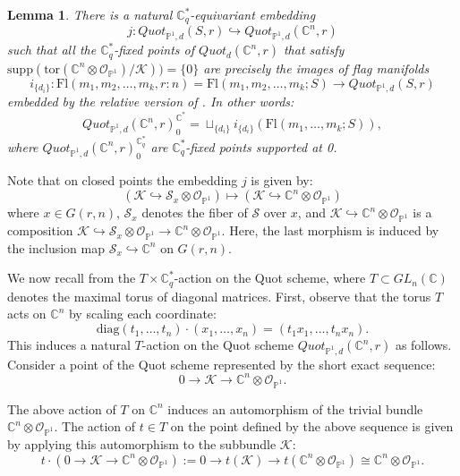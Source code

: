 \documentclass{amsart}
\newtheorem{lemma}[thm]{Lemma}
\begin{document}
\begin{lemma}\label{Relative fixed-points}
    There is a natural $\mathbb{C}_q^*$-equivariant embedding
    \[
    j:Quot_{\mathbb{P}^1,d}(S,r) \hookrightarrow Quot_{\mathbb{P}^1,d}(\mathbb{C}^n,r) 
    \]
    such that all the $\mathbb{C}_q^*$-fixed points of $Quot_d(\mathbb{C}^n,r)$ that satisfy $\mathrm{supp}(\mathrm{tor}(\mathbb{C}^n \otimes \mathcal{O}_{\mathbb{P}^1})/\mathcal{K}))=\{0\}$ are precisely the images of flag manifolds
    \[
    i_{\{d_i\}}: \mathrm{Fl}(m_1 , m_2, \dots , m_k,r:n)=\mathrm{Fl}(m_1 , m_2 , \dots , m_k;S) \to Quot_{\mathbb{P}^1,d}(S,r)
    \]
    embedded by the relative version of . In other words:
    \[
    Quot_{\mathbb{P}^1,d}(\mathbb{C}^n,r)^{\mathbb{C}^*}_0 = \sqcup_{\{d_i\}}i_{\{d_i\}} (\mathrm{Fl}(m_1,\dots,m_k;S)),
    \]
    where $Quot_{\mathbb{P}^1,d}(\mathbb{C}^n,r)^{\mathbb{C}_q^*}_0$ are $\mathbb{C}_q^*$-fixed points supported at 0.
\end{lemma}
Note that on closed points the embedding $j$ is given by:
\[
(\mathcal{K} \hookrightarrow \mathcal{S}_x \otimes \mathcal{O}_{\mathbb{P}^1}) \mapsto (\mathcal{K} \hookrightarrow \mathbb{C}^n \otimes \mathcal{O}_{\mathbb{P}^1})
\]
where $x \in G(r,n)$, $\mathcal{S}_x$ denotes the fiber of $\mathcal{S}$ over $x$, and $\mathcal{K} \hookrightarrow \mathbb{C}^n \otimes \mathcal{O}_{\mathbb{P}^1}$ is a composition 
$\mathcal{K} \hookrightarrow \mathcal{S}_x \otimes \mathcal{O}_{\mathbb{P}^1} \to \mathbb{C}^n \otimes \mathcal{O}_{\mathbb{P}^1} $. Here, the last morphism is induced by the inclusion map $ \mathcal{S}_x\hookrightarrow \mathbb{C}^n$ on $G(r,n)$.

We now recall from \cite{MR908717} the $T \times \mathbb{C}_q^*$-action on the Quot scheme, where $T \subset GL_n(\mathbb{C})$ denotes the maximal torus of diagonal matrices. 
First, observe that the torus $T$ acts on $\mathbb{C}^n$ by scaling each coordinate: 
\begin{equation} \label{Torus action}
\mathrm{diag}(t_1,\dots,t_n)\cdot(x_1,\dots,x_n) = (t_1x_1,\dots,t_nx_n).
\end{equation}
This induces a natural $T$-action on the Quot scheme $Quot_{\mathbb{P}^1,d}(\mathbb{C}^n,r)$ as follows. Consider a point of the Quot scheme represented by the short exact sequence:
\[
0 \to \mathcal{K} \to \mathbb{C}^n \otimes \mathcal{O}_{\mathbb{P}^1}. 
\]

The above action of $T$ on $\mathbb{C}^n$ induces an automorphism of the trivial bundle  $\mathbb{C}^n \otimes \mathcal{O}_{\mathbb{P}^1}$. 
The action of $t \in T$ on the point defined by the above sequence is given by applying this automorphism to the subbundle $\mathcal{K}$:
\[
t\cdot(0 \to \mathcal{K} \to \mathbb{C}^n \otimes \mathcal{O}_{\mathbb{P}^1}) := 0 \to t(\mathcal{K}) \to t(\mathbb{C}^n \otimes \mathcal{O}_{\mathbb{P}^1}) \cong \mathbb{C}^n \otimes \mathcal{O}_{\mathbb{P}^1}.
\]
\end{document}
